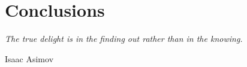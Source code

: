 \chapter{Conclusions}\label{ch6}
\setlength{\epigraphrule}{0pt}
\setlength{\epigraphwidth}{0.75\textwidth}
\epigraph{\textit{The true delight is in the finding out rather than in the knowing.}}{Isaac Asimov}



